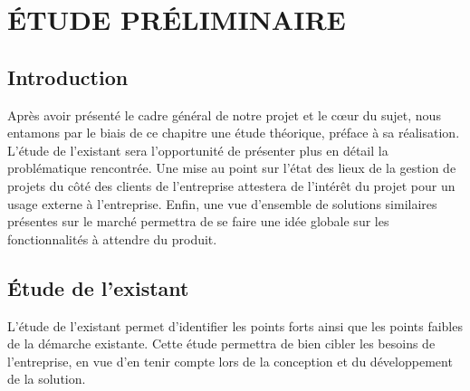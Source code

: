 \setcounter{chapter}{1}
\chapter{ÉTUDE PRÉLIMINAIRE}
\minitoc %
\graphicspath{{Chapitre2/figures/}}


\pagestyle{fancy}
\fancyhf{}
\fancyhead[R]{\bfseries\rightmark}
\fancyfoot[R]{\thepage}
\renewcommand{\headrulewidth}{0.5pt}
\renewcommand{\footrulewidth}{0pt}
\renewcommand{\chaptermark}[1]{\markboth{\MakeUppercase{\chaptername~\thechapter. #1 }}{}}
\renewcommand{\sectionmark}[1]{\markright{\thechapter.\thesection~ #1}}

\begin{spacing}{1.5}

\section*{Introduction}
Après avoir présenté le cadre général de notre projet et le cœur du sujet, nous entamons par le biais de ce chapitre une étude théorique, préface à sa réalisation. L'étude de l'existant sera l'opportunité de présenter plus en détail la problématique rencontrée. Une mise au point sur l'état des lieux de la gestion de projets du côté des clients de l'entreprise attestera de l'intérêt du projet pour un usage externe à l'entreprise. Enfin, une vue d'ensemble de solutions similaires présentes sur le marché permettra de se faire une idée globale sur les fonctionnalités à attendre du produit.


\section{Étude de l'existant}
L'étude de l'existant permet d'identifier les points forts ainsi que les points faibles de la démarche existante. Cette étude permettra de bien cibler les besoins de l'entreprise, en vue d'en tenir compte lors de la conception et du développement de la solution.

\end{spacing}
